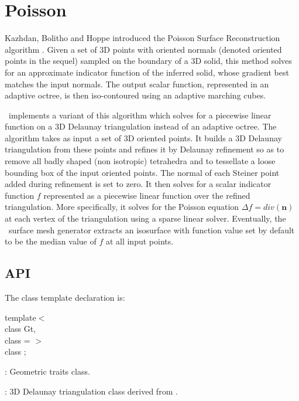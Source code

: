\section{Poisson}

Kazhdan, Bolitho and Hoppe introduced the Poisson Surface Reconstruction algorithm \cite{Kazhdan06}. Given a set of 3D points with oriented normals (denoted oriented points in the sequel) sampled on the boundary of a 3D solid, this method solves for an approximate indicator function of the inferred solid, whose gradient best matches the input normals. The output scalar function, represented in an adaptive octree, is then iso-contoured using an adaptive marching cubes.

\cgal\ implements a variant of this algorithm which solves for a piecewise linear function on a 3D Delaunay triangulation instead of an adaptive octree. The algorithm takes as input a set of 3D oriented points. It builds a 3D Delaunay triangulation from these points and refines it by Delaunay refinement so as to remove all badly shaped (non isotropic) tetrahedra and to tessellate a loose bounding box of the input oriented points. The normal of each Steiner point added during refinement is set to zero. It then solves for a scalar indicator function $f$ represented as a piecewise linear function over the refined triangulation. More specifically, it solves for the Poisson equation  $\Delta f = div(\mathbf{n})$ at each vertex of the triangulation using a sparse linear solver. Eventually, the \cgal\ surface mesh generator extracts an isosurface with function value set by default to be the median value of $f$ at all input points.

\subsection{API}

The class template declaration is:

template$<$  \\
class Gt,   \\
class  = $>$   \\
class ;
\ccGlue
{}
\begin{description}
\item {}: Geometric traits class. \item {}: 3D Delaunay triangulation class derived from . \end{description}

